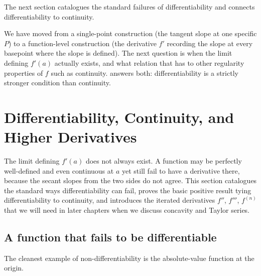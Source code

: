 The next section catalogues the standard failures of differentiability and connects differentiability to continuity.

We have moved from a single-point construction (the tangent slope at one specific \(P\)) to a function-level construction (the derivative \(f'\) recording the slope at every basepoint where the slope is defined). The next question is when the limit defining \(f'(a)\) actually exists, and what relation that has to other regularity properties of \(f\) such as continuity.  answers both: differentiability is a strictly stronger condition than continuity.

\section{Differentiability, Continuity, and Higher Derivatives}\label{sec:differentiability-continuity}

The limit defining \(f'(a)\) does not always exist. A function may be perfectly well-defined and even continuous at \(a\) yet still fail to have a derivative there, because the secant slopes from the two sides do not agree. This section catalogues the standard ways differentiability can fail, proves the basic positive result tying differentiability to continuity, and introduces the iterated derivatives \(f''\), \(f'''\), \(f^{(n)}\) that we will need in later chapters when we discuss concavity and Taylor series.

\subsection{A function that fails to be differentiable}

The cleanest example of non-differentiability is the absolute-value function at the origin.

